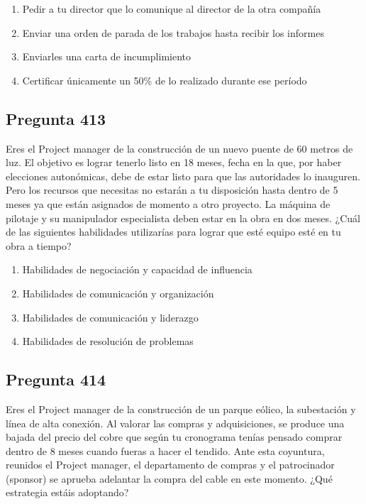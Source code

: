 \documentclass[11pt,a4paper]{article}
\begin{document}
\begin{enumerate}[label=\alph*)]
  \item Pedir a tu director que lo comunique al director de la otra compañía
  \item Enviar una orden de parada de los trabajos hasta recibir los informes
  \item Enviarles una carta de incumplimiento
  \item Certificar únicamente un 50\% de lo realizado durante ese período
\end{enumerate}

\subsection*{Pregunta 413}
Eres el Project manager de la construcción de un nuevo puente de 60 metros de luz. El objetivo es lograr tenerlo listo en 18 meses, fecha en la que, por haber elecciones autonómicas, debe de estar listo para que las autoridades lo inauguren. Pero los recursos que necesitas no estarán a tu disposición hasta dentro de 5 meses ya que están asignados de momento a otro proyecto. La máquina de pilotaje y su manipulador especialista deben estar en la obra en dos meses. ¿Cuál de las siguientes habilidades utilizarías para lograr que esté equipo esté en tu obra a tiempo?

\begin{enumerate}[label=\alph*)]
  \item Habilidades de negociación y capacidad de influencia
  \item Habilidades de comunicación y organización
  \item Habilidades de comunicación y liderazgo
  \item Habilidades de resolución de problemas
\end{enumerate}

\subsection*{Pregunta 414}
Eres el Project manager de la construcción de un parque eólico, la subestación y línea de alta conexión. Al valorar las compras y adquisiciones, se produce una bajada del precio del cobre que según tu cronograma tenías pensado comprar dentro de 8 meses cuando fueras a hacer el tendido. Ante esta coyuntura, reunidos el Project manager, el departamento de compras y el patrocinador (sponsor) se aprueba adelantar la compra del cable en este momento. ¿Qué estrategia estáis adoptando?
\end{document}
